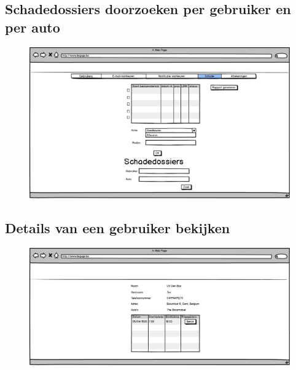 \documentclass[11pt,a4paper,oneside]{article}
\begin{document}
\subsection{Schadedossiers doorzoeken per gebruiker en per auto}
\begin{figure}[H]\includegraphics[width=\textwidth]{../../mockups/admin_schade.png}\end{figure}

\subsection{Details van een gebruiker bekijken}
\begin{figure}[H]\includegraphics[width=\textwidth]{../../mockups/gebruiker_profiel.png}\end{figure}
\end{document}
